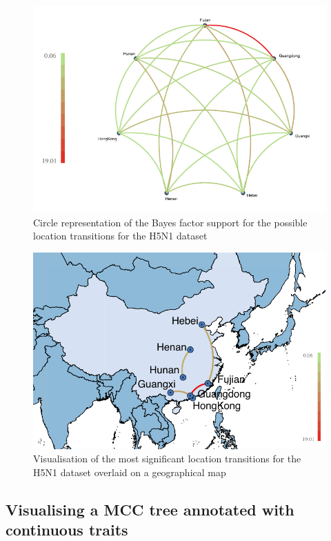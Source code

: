 \documentclass[english]{paper}
\begin{document}
\begin{figure}%
\centering
\includegraphics[width=1\textwidth]{./figures/bf_circle_final.pdf} %
\caption{Circle representation of the Bayes factor support for the possible location transitions for the H5N1 dataset}
\label{fig:BFcircle}
\end{figure}

\begin{figure}%
\centering
\includegraphics[width=1\textwidth]{./figures/bf_map_update.pdf} %
\caption{Visualisation of the most significant location transitions for the H5N1 dataset overlaid on a geographical map}
\label{fig:BFmap}
\end{figure}



\subsection{Visualising a MCC tree annotated with continuous traits}
\label{MCCcontinuous}
\end{document}
